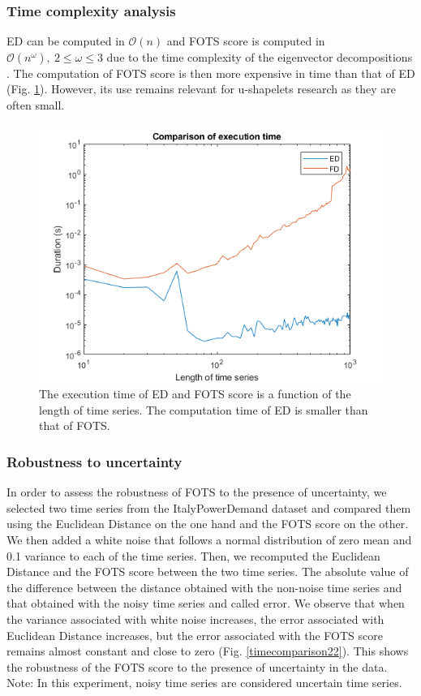 \subsubsection{Time complexity analysis} ED can be computed in $\mathcal{O}(n)$ and  FOTS score is computed in $\mathcal{O}(n^\omega),\:2\leq\omega\leq3$ due to the time complexity of the eigenvector decompositions \cite{pan1999complexity}. The computation of FOTS score is then more expensive in time than that of ED (Fig. \ref{timecomparison}). However, its use remains relevant for u-shapelets research as they are often small.


\begin{figure}[h]
\centering
 \includegraphics[scale=0.50]{images/temps_ED_FOTS}
\caption{The execution time of ED and FOTS score is a function of the length of time series. The computation time of ED is smaller than that of FOTS.}
\label{timecomparison}
\end{figure}

\subsubsection{Robustness to uncertainty}
In order to assess the robustness of FOTS to the presence of uncertainty, we selected two time series from the ItalyPowerDemand dataset and compared them using the Euclidean Distance on the one hand and the FOTS score on the other. We then added a white noise that follows a normal distribution of zero mean and 0.1 variance to each of the time series. Then, we recomputed the Euclidean Distance and the FOTS score between the two time series. The absolute value of the difference between the distance obtained with the non-noise time series and that obtained with the noisy time series and called error. We observe that when the variance associated with white noise increases, the error associated with Euclidean Distance increases, but the error associated with the FOTS score remains almost constant and close to zero (Fig. \ref{timecomparison22}). This shows the robustness of the FOTS score to the presence of uncertainty in the data. Note: In this experiment, noisy time series are considered uncertain time series.

